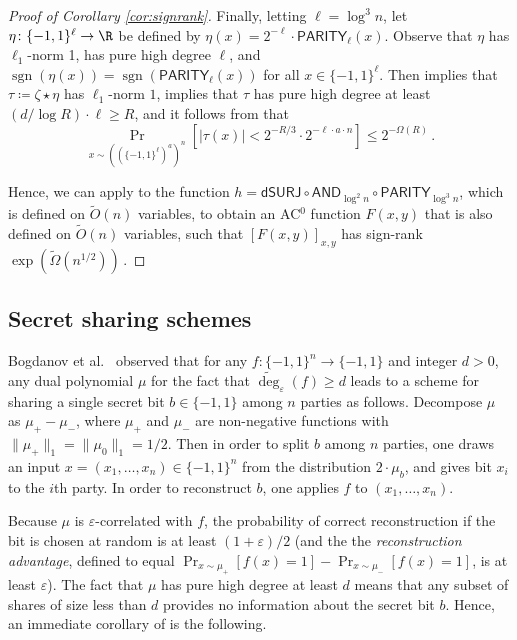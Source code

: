 \documentclass{toc}
\newcommand{\sgn}{\mathrm{sign}}
\newcommand{\dumSURJ}{\mathsf{dSURJ}}
\newcommand{\bits}{\{-1,1\}}
\newcommand{\ls}{\star}
\newcommand{\eps}{\varepsilon}
\newcommand{\adeg}{\widetilde{\operatorname{deg}}}
\newcommand{\AND}{\mathsf{AND}}
\newcommand{\PARITY}{\mathsf{PARITY}}
\renewcommand{\sgn}{\operatorname{sgn}}
\begin{document}
\begin{proof}[Proof of Corollary \ref{cor:signrank}]
Finally, letting $\ell=\log^3 n$, let $\eta \colon \bits^{\ell} \to \R $ be defined by $\eta(x) = 2^{-\ell} \cdot \PARITY_{\ell}(x)$. 
Observe that $\eta$ has $\ell_1$-norm 1, has pure high degree $\ell$, and $\sgn(\eta(x))=\sgn(\PARITY_{\ell}(x))$ for all $x \in \bits^\ell$.
Then  implies that $\tau \coloneqq  \zeta \ls \eta$ has $\ell_1$-norm $1$,  implies that $\tau$ has pure high degree at least $(d/\log R) \cdot \ell \geq R$,
and it follows from   that 
\begin{equation}
\Pr_{x \sim \left(\left(\bits^{\ell}\right)^a\right)^n}[|\tau(x)| < 2^{-R/3} \cdot 2^{-\ell \cdot a \cdot n}] \leq 2^{-\Omega(R)}\,.
\end{equation}

Hence, we can apply  to the function $h=\dumSURJ \circ \AND_{\log^2 n} \circ \PARITY_{\log^3 n}$, which is defined on $\tilde{O}(n)$
variables, to obtain an AC$^0$ function $F(x, y)$ that is also defined on $\tilde{O}(n)$ variables, such that $[F(x, y)]_{x, y}$ has sign-rank $\exp(\tilde{\Omega}(n^{1/2}))$\,.
\end{proof}





\subsection{Secret sharing schemes}
Bogdanov et al.~\cite{viola} observed that for any
$f \colon \bits^n \to \bits$ and integer $d>0$, any dual polynomial $\mu$
for the fact that $\adeg_{\eps}(f) \geq d$ leads to a scheme
for sharing a single secret bit $b \in \bits$ among $n$ parties as follows.
Decompose $\mu$ as $\mu_{+} - \mu_{-}$, where $\mu_{+}$ and $\mu_{-}$
are non-negative functions with $\|\mu_{+}\|_1 = \|\mu_{0}\|_1 = 1/2$. Then in order to split $b$
among $n$ parties,
one draws an input $x=(x_1, \dots, x_n) \in \bits^n$ from the distribution $2 \cdot \mu_b$, and
gives bit $x_i$ to the $i$th party.
In order to reconstruct $b$, one applies $f$ to $(x_1, \dots, x_n)$.

Because $\mu$ is $\eps$-correlated with $f$, the probability of correct reconstruction if the bit is 
chosen at random
is at least $(1+\eps)/2$ (and the the \emph{reconstruction advantage}, 
defined to equal $\Pr_{x \sim \mu_{+}}[f(x) = 1] - \Pr_{x\sim\mu_{-}}[f(x) = 1]$, is at least
$\eps$). 
The fact that $\mu$ has pure high degree at least $d$
means that any subset of shares of size less than $d$ provides no information 
about the secret bit $b$. 
Hence, an immediate corollary of  is the following.
\end{document}
